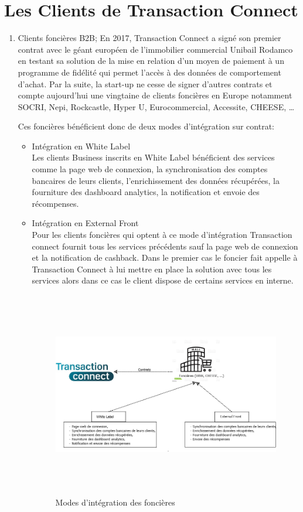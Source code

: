 \section{Les Clients de Transaction Connect}
\begin{enumerate}
\item Clients foncières B2B;
En 2017, Transaction Connect a signé son premier contrat avec le géant européen de l’immobilier commercial Unibail Rodamco en testant sa solution de la mise en relation d’un moyen de paiement à un programme de fidélité qui permet l’accès à des données de comportement d’achat. Par la suite, la start-up ne cesse de signer d’autres contrats et compte aujourd’hui une vingtaine de clients foncières en Europe notamment SOCRI, Nepi, Rockcastle, Hyper U, Eurocommercial, Accessite, CHEESE, …

Ces foncières bénéficient donc de deux modes d’intégration sur contrat:
\begin{itemize}
\item Intégration en White Label\\
Les clients Business inscrits en White Label bénéficient des services comme la page web de connexion, la synchronisation des comptes bancaires de leurs clients, l’enrichissement des données récupérées, la fourniture des dashboard analytics, la notification et envoie des récompenses.
\item Intégration en External Front\\
Pour les clients foncières qui optent à ce mode d’intégration Transaction connect fournit tous les services précédents sauf la page web de connexion et la notification de cashback. Dans le premier cas le foncier fait appelle à Transaction Connect à lui mettre en place la solution avec tous les services alors dans ce cas le client dispose de certains services en interne.

\begin{figure}[h]
\begin{center}
\includegraphics[width=15cm,height=9cm]{images/business_links.png}
\caption[Modes d'intégration des foncières]{Modes d'intégration des foncières}
\label{monlabel}
\end{center}
\end{figure}
\end{itemize}
\newpage


\end{enumerate}
